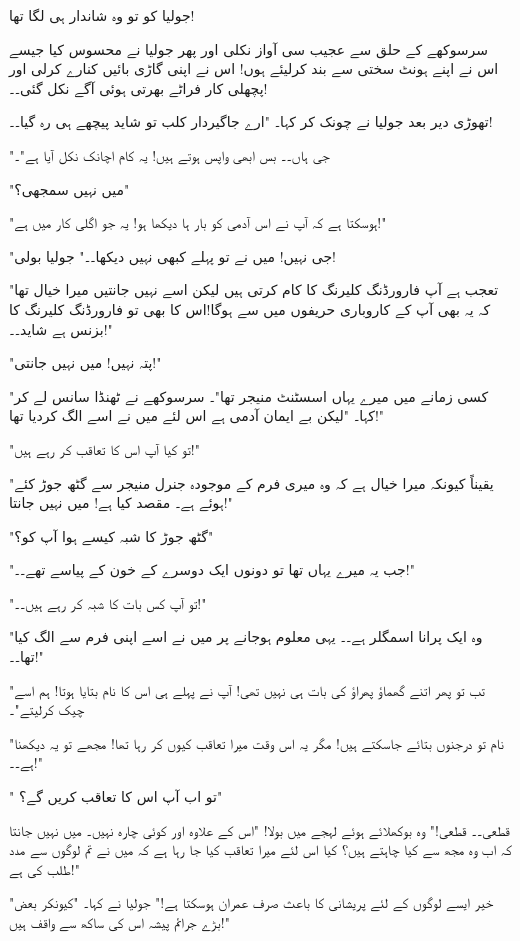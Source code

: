 جولیا کو تو وہ شاندار ہی لگا تھا!

سرسوکھے کے حلق سے عجیب سی آواز نکلی اور پھر جولیا نے محسوس کیا جیسے اس نے اپنے ہونٹ سختی سے بند کرلیئے ہوں! اس نے اپنی گاڑی بائیں کنارے کرلی اور پچھلی کار فراٹے بھرتی ہوئی آگے نکل گئی۔۔!

تھوڑی دیر بعد جولیا نے چونک کر کہا۔ "ارے جاگیردار کلب تو شاید پیچھے ہی رہ گیا۔۔!

"جی ہاں۔۔ بس ابھی واپس ہوتے ہیں! یہ کام اچانک نکل آیا ہے"۔

"میں نہیں سمجھی؟"

"ہوسکتا ہے کہ آپ نے اس آدمی کو بار ہا دیکھا ہو! یہ جو اگلی کار میں ہے!"

"جی نہیں! میں نے تو پہلے کبھی نہیں دیکھا۔۔" جولیا بولی!

"تعجب ہے آپ فارورڈنگ کلیرنگ کا کام کرتی ہیں لیکن اسے نہیں جانتیں میرا خیال تھا کہ یہ بھی آپ کے کاروباری حریفوں میں سے ہوگا!اس کا بھی تو فارورڈنگ کلیرنگ کا بزنس ہے شاید۔۔!"

"پتہ نہیں! میں نہیں جانتی!"

"کسی زمانے میں میرے یہاں اسسٹنٹ منیجر تھا"۔ سرسوکھے نے ٹھنڈا سانس لے کر کہا۔ "لیکن بے ایمان آدمی ہے اس لئے میں نے اسے الگ کردیا تھا!"

"تو کیا آپ اس کا تعاقب کر رہے ہیں!"

"یقیناً کیونکہ میرا خیال ہے کہ وہ میری فرم کے موجودہ جنرل منیجر سے گٹھ جوڑ کئے ہوئے ہے۔ مقصد کیا ہے! میں نہیں جانتا!"

"گٹھ جوڑ کا شبہ کیسے ہوا آپ کو؟"

"جب یہ میرے یہاں تھا تو دونوں ایک دوسرے کے خون کے پیاسے تھے۔۔!"

"تو آپ کس بات کا شبہ کر رہے ہیں۔۔!"

"وہ ایک پرانا اسمگلر ہے۔۔ یہی معلوم ہوجانے پر میں نے اسے اپنی فرم سے الگ کیا تھا۔۔!"

"تب تو پھر اتنے گھماؤ پھراؤ کی بات ہی نہیں تھی! آپ نے پہلے ہی اس کا نام بتایا ہوتا! ہم اسے چیک کرلیتے"۔

"نام تو درجنوں بتائے جاسکتے ہیں! مگر یہ اس وقت میرا تعاقب کیوں کر رہا تھا! مجھے تو یہ دیکھنا ہے۔۔!"

" تو اب آپ اس کا تعاقب کریں گے؟"

قطعی۔۔ قطعی!" وہ بوکھلائے ہوئے لہجے میں بولا! "اس کے علاوہ اور کوئی چارہ نہیں۔ میں نہیں جانتا کہ اب وہ مجھ سے کیا چاہتے ہیں؟ کیا اس لئے میرا تعاقب کیا جا رہا ہے کہ میں نے تم لوگوں سے مدد طلب کی ہے!"

"خیر ایسے لوگوں کے لئے پریشانی کا باعث صرف عمران ہوسکتا ہے!" جولیا نے کہا۔ "کیونکر بعض بڑے جرائم پیشہ اس کی ساکھ سے واقف ہیں!"


